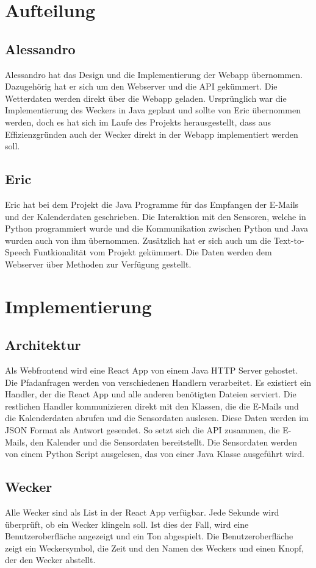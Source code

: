 \documentclass[11pt,a4paper]{article}
\begin{document}
\section{Aufteilung}
\subsection{Alessandro}
Alessandro hat das Design und die Implementierung der Webapp übernommen. Dazugehörig hat er sich um den Webserver und die API gekümmert. Die Wetterdaten werden direkt über die Webapp geladen. Ursprünglich war die Implementierung des Weckers in Java geplant und sollte von Eric übernommen werden, doch es hat sich im Laufe des Projekts herausgestellt, dass aus Effizienzgründen auch der Wecker direkt in der Webapp implementiert werden soll.

\subsection{Eric}
Eric hat bei dem Projekt die Java Programme für das Empfangen der E-Mails und der Kalenderdaten geschrieben. Die Interaktion mit den Sensoren, welche in Python programmiert wurde und die Kommunikation zwischen Python und Java wurden auch von ihm \"ubernommen. Zusätzlich hat er sich auch um die Text-to-Speech Funtkionalit\"at vom Projekt gek\"ummert. Die Daten werden dem Webserver über Methoden zur Verfügung gestellt.

\section{Implementierung}
\subsection{Architektur}
Als Webfrontend wird eine React App von einem Java HTTP Server gehostet. Die Pfadanfragen werden von verschiedenen Handlern verarbeitet. Es existiert ein Handler, der die React App und alle anderen benötigten Dateien serviert. Die restlichen Handler kommunizieren direkt mit den Klassen, die die E-Mails und die Kalenderdaten abrufen und die Sensordaten auslesen. Diese Daten werden im JSON Format als Antwort gesendet. So setzt sich die API zusammen, die E-Mails, den Kalender und die Sensordaten bereitstellt. Die Sensordaten werden von einem Python Script ausgelesen, das von einer Java Klasse ausgeführt wird.

\subsection{Wecker}
Alle Wecker sind als List in der React App verfügbar. Jede Sekunde wird überprüft, ob ein Wecker klingeln soll. Ist dies der Fall, wird eine Benutzeroberfläche angezeigt und ein Ton abgespielt. Die Benutzeroberfläche zeigt ein Weckersymbol, die Zeit und den Namen des Weckers und einen Knopf, der den Wecker abstellt.
\end{document}
